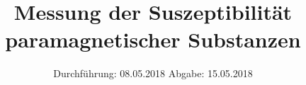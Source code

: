 

\subject{606}
\title{Messung der Suszeptibilität paramagnetischer Substanzen}
\date{%
  Durchführung: 08.05.2018
  \hspace{3em}
  Abgabe: 15.05.2018
}



\maketitle
\thispagestyle{empty}
\tableofcontents
\newpage






\printbibliography{}


